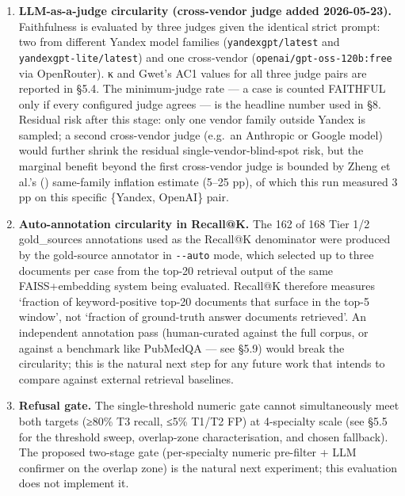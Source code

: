 \documentclass[
  american,
  a4paper,
]{article}
\begin{document}
\begin{enumerate}
  non-English medical literature; the adversarial test (§5.2.1) probes
  Russian / French / Spanish surface vocabulary mapped against the
  English corpus, with 16/16 = 100\% routing accuracy, but the retrieval
  and generation are not validated on non-English queries.
\item
  \textbf{LLM-as-a-judge circularity (cross-vendor judge added
  2026-05-23).} Faithfulness is evaluated by three judges given the
  identical strict prompt: two from different Yandex model families
  (\texttt{yandexgpt/latest} and \texttt{yandexgpt-lite/latest}) and one
  cross-vendor (\texttt{openai/gpt-oss-120b:free} via OpenRouter). κ and
  Gwet's AC1 values for all three judge pairs are reported in §5.4. The
  minimum-judge rate --- a case is counted FAITHFUL only if every
  configured judge agrees --- is the headline number used in §8.
  Residual risk after this stage: only one vendor family outside Yandex
  is sampled; a second cross-vendor judge (e.g.~an Anthropic or Google
  model) would further shrink the residual single-vendor-blind-spot
  risk, but the marginal benefit beyond the first cross-vendor judge is
  bounded by Zheng et al.'s () same-family inflation estimate (5--25 pp), of which this
  run measured 3 pp on this specific \{Yandex, OpenAI\} pair.
\item
  \textbf{Auto-annotation circularity in Recall@K.} The 162 of 168 Tier
  1/2 gold\_sources annotations used as the Recall@K denominator were
  produced by the gold-source annotator in \texttt{-\/-auto} mode, which
  selected up to three documents per case from the top-20 retrieval
  output of the same FAISS+embedding system being evaluated. Recall@K
  therefore measures `fraction of keyword-positive top-20 documents that
  surface in the top-5 window', not `fraction of ground-truth answer
  documents retrieved'. An independent annotation pass (human-curated
  against the full corpus, or against a benchmark like PubMedQA --- see
  §5.9) would break the circularity; this is the natural next step for
  any future work that intends to compare against external retrieval
  baselines.
\item
  \textbf{Refusal gate.} The single-threshold numeric gate cannot
  simultaneously meet both targets (≥80\% T3 recall, ≤5\% T1/T2 FP) at
  4-specialty scale (see §5.5 for the threshold sweep, overlap-zone
  characterisation, and chosen fallback). The proposed two-stage gate
  (per-specialty numeric pre-filter + LLM confirmer on the overlap zone)
  is the natural next experiment; this evaluation does not implement it.

\end{enumerate}
\end{document}

